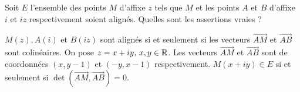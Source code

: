 \begin{question} 

Soit $E$ l'ensemble des points $M$ d'affixe $z$ tels que $M$ et les points $A$ et $B$ d'affixe $i$ et $iz$ respectivement 
soient alignés. Quelles sont les assertions vraies ?
\begin{answers}
    
    
    
    
    
     

\end{answers}
\begin{explanations}
$M(z), A(i)$ et $B(iz)$ sont alignés si et seulement si les vecteurs $\overrightarrow{AM}$ et $\overrightarrow{AB}$
sont colinéaires. On pose $z=x+iy, \, x,y\in \mathbb{R}$. Les vecteurs $\overrightarrow{AM}$ et $\overrightarrow{AB}$ sont de coordonnées $(x,y-1)$ et $(-y,x-1)$ respectivement. $M(x+iy) \in E$ si et seulement si  $\det(\overrightarrow{AM},   \overrightarrow{AB})=0$. 

\end{explanations}

\end{question}




